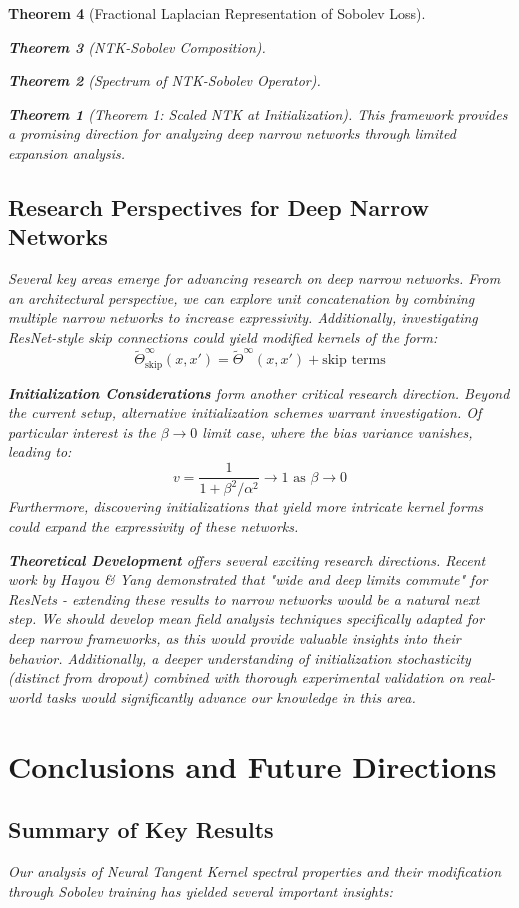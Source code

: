 \documentclass{article}
\newtheorem{theorem}{Theorem}[section]
\begin{document}
\begin{theorem}[Fractional Laplacian Representation of Sobolev Loss]
\begin{theorem}[NTK-Sobolev Composition]
\begin{theorem}[Spectrum of NTK-Sobolev Operator]
\begin{theorem}[Theorem 1: Scaled NTK at Initialization]
This framework provides a promising direction for analyzing deep narrow networks through limited expansion analysis.

\subsection{Research Perspectives for Deep Narrow Networks}

Several key areas emerge for advancing research on deep narrow networks. From an architectural perspective, we can explore unit concatenation by combining multiple narrow networks to increase expressivity. Additionally, investigating ResNet-style skip connections could yield modified kernels of the form:
\[ \tilde{\Theta}^\infty_{\text{skip}}(x, x') = \tilde{\Theta}^\infty(x, x') + \text{skip terms} \]

\textbf{Initialization Considerations} form another critical research direction. Beyond the current setup, alternative initialization schemes warrant investigation. Of particular interest is the $\beta \to 0$ limit case, where the bias variance vanishes, leading to:
\[ v = \frac{1}{1 + \beta^2/\alpha^2} \to 1 \text{ as } \beta \to 0 \]
Furthermore, discovering initializations that yield more intricate kernel forms could expand the expressivity of these networks.

\textbf{Theoretical Development} offers several exciting research directions. Recent work by Hayou & Yang demonstrated that "wide and deep limits commute" for ResNets - extending these results to narrow networks would be a natural next step. We should develop mean field analysis techniques specifically adapted for deep narrow frameworks, as this would provide valuable insights into their behavior. Additionally, a deeper understanding of initialization stochasticity (distinct from dropout) combined with thorough experimental validation on real-world tasks would significantly advance our knowledge in this area.

\section{Conclusions and Future Directions}

\subsection{Summary of Key Results}

Our analysis of Neural Tangent Kernel spectral properties and their modification through Sobolev training has yielded several important insights:


\end{theorem}
\end{theorem}
\end{theorem}
\end{theorem}
\end{document}
